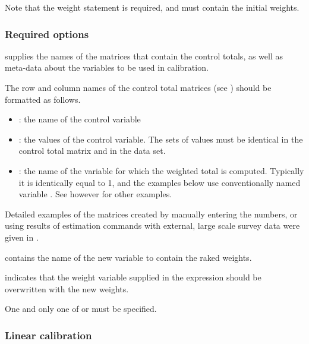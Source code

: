 \hangpara
Note that the weight statement \stcmd{[pw=\varname]} is required, and must contain the initial weights.

\subsubsection{Required options}

\hangpara
{} \RB\stcmd{)}
supplies the names of the matrices that contain the control
totals, as well as meta-data about the variables to be used
in calibration.

\begin{sttech}
The row and column names of the control total matrices
(see ) should be formatted as follows.
\begin{itemize}
    \item {}: the name of the control variable
    \item {}: the values of the control variable. The sets of values
          must be identical in the control total matrix and in the data set.
    \item {}: the name of the variable for which the weighted total is computed.
          Typically it is identically equal to 1, and the examples below
          use conventionally named variable . See however
          \citet{kolenikov:hammer:2015} for other examples.
\end{itemize}

Detailed examples of the matrices created by manually entering the numbers,
or using results of estimation commands with external, large scale survey data
were given in \citet{kolenikov:2014}.

\end{sttech}

\hangpara
{}
contains the name of the new variable to contain the raked weights.

\hangpara
{} indicates that the weight variable supplied in the
\stcmd{[pw=\varname]} expression should be overwritten with the new weights.

One and only one of  or  must be specified.

\subsubsection{Linear calibration}

